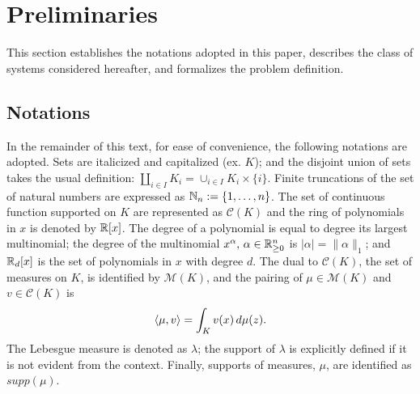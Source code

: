   \section{Preliminaries}
\label{sec:preliminaries}
  This section establishes the notations adopted in this paper, describes the class of systems considered hereafter, and formalizes the problem definition.
  \subsection{Notations}
  In the remainder of this text, for ease of convenience, the following notations are adopted. Sets are italicized and capitalized (ex. $K$); and the disjoint union of sets takes the usual definition: $\coprod_{i\in I}K_i=\cup_{i\in I}K_i\times \{i\}$. Finite truncations of the set of natural numbers are expressed as \mbox{$\mathbb{N}_n:=\{1,\ldots,n\}$}. The set of continuous function supported on $K$ are represented as $\mathcal C(K)$ and the ring of polynomials in $x$ is denoted by $\mathbb{R}[x]$. The degree of a polynomial is equal to degree its largest multinomial; the degree of the multinomial $x^\alpha,\,\alpha\in \mathbb{R}_{\ge 0}^n$ is $|\alpha|=\|\alpha\|_1$; and $\mathbb{R}_d[x]$ is the set of polynomials in $x$ with degree $d$. The dual to $\mathcal C(K)$, the set of measures on $K$, is identified by $\mathcal M(K)$, and the pairing of $\mu\in \mathcal M(K)$ and $v\in \mathcal C(K)$ is
  $$\left\langle \mu,v\right\rangle=\int_{K}v(x)\,d\mu(z).$$
  The Lebesgue measure is denoted as $\lambda$; the support of $\lambda$ is explicitly defined if it is not evident from the context. Finally, supports of measures, $\mu$, are identified as $supp(\mu)$.
